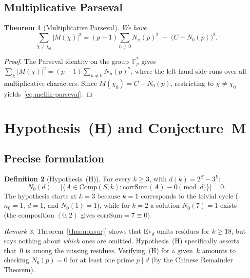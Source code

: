 \documentclass[12pt, a4paper]{amsart}
\theoremstyle{plain}
\newtheorem{theorem}{Theorem}[section]
\theoremstyle{definition}
\newtheorem{definition}[theorem]{Definition}
\theoremstyle{remark}
\newtheorem{remark}[theorem]{Remark}
\newcommand{\Fp}{\mathbb{F}_p}
\newcommand{\Comp}{\mathrm{Comp}}
\newcommand{\Ev}{\mathrm{Ev}}
\newcommand{\corrSum}{\mathrm{corrSum}}
\begin{document}
\subsection{Multiplicative Parseval}

\begin{theorem}[Multiplicative Parseval]\label{thm:mellin-parseval}
  We have
  \begin{equation}\label{eq:mellin-parseval}
    \sum_{\chi \neq \chi_0} |M(\chi)|^2
    = (p-1)\sum_{n \neq 0} N_n(p)^2
    \;-\; \bigl(C - N_0(p)\bigr)^2.
  \end{equation}
\end{theorem}

\begin{proof}
  The Parseval identity on the group~$\Fp^*$ gives
  $\sum_\chi |M(\chi)|^2 = (p-1)\sum_{n \neq 0} N_n(p)^2$,
  where the left-hand side runs over all multiplicative
  characters.  Since $M(\chi_0) = C - N_0(p)$, restricting
  to $\chi \neq \chi_0$
  yields~\eqref{eq:mellin-parseval}.
\end{proof}

\section{Hypothesis~(H) and Conjecture~M}\label{sec:gap}

\subsection{Precise formulation}

\begin{definition}[Hypothesis~(H)]\label{def:hypothesis-H}
  For every $k \geq 3$, with $d(k) = 2^S - 3^k$:
  \[
    N_0(d) = \bigl|\{A \in \Comp(S,k) :
    \corrSum(A) \equiv 0 \pmod{d}\}\bigr| = 0.
  \]
  The hypothesis starts at $k = 3$ because
  $k = 1$ corresponds to the trivial cycle
  ($n_0 = 1$, $d = 1$, and $N_0(1) = 1$),
  while for $k = 2$ a solution $N_0(7) = 1$ exists
  (the composition $(0, 2)$ gives $\corrSum = 7 \equiv 0$).
\end{definition}

\begin{remark}\label{rem:H-meaning}
  Theorem~\ref{thm:nonsurj} shows that $\Ev_d$ omits residues
  for $k \geq 18$, but says nothing about \emph{which} ones
  are omitted.
  Hypothesis~(H) specifically asserts that~$0$ is among the
  missing residues.
  Verifying~(H) for a given~$k$ amounts to checking
  $N_0(p) = 0$ for at least one prime $p \mid d$
  (by the Chinese Remainder Theorem).
\end{remark}
\end{document}
